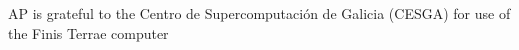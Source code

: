 \documentclass[aps,prl,superscriptaddress,twocolumn]{revtex4}
\begin{document}
\begin{acknowledgments}
AP is grateful to the Centro de
Supercomputación de Galicia (CESGA) for use of the Finis
Terrae computer
\end{acknowledgments}





\end{document}

